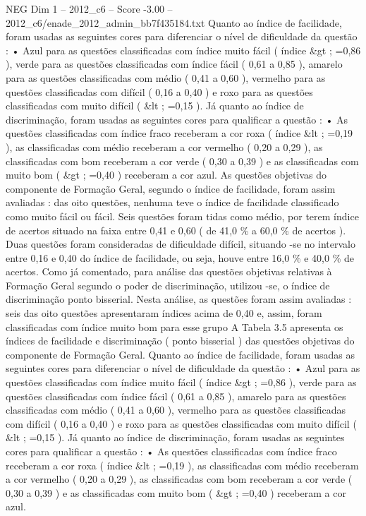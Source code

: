 \begin{textsample}{NEG Dim 1 – 2012\_c6 – Score -3.00 – 2012\_c6/enade\_2012\_admin\_bb7f435184.txt}
Quanto ao índice de facilidade, foram usadas as seguintes cores para diferenciar o nível de dificuldade da questão : • Azul para as questões classificadas com índice muito fácil ( índice \&gt ; =0,86 ), verde para as questões classificadas com índice fácil ( 0,61 a 0,85 ), amarelo para as questões classificadas com médio ( 0,41 a 0,60 ), vermelho para as questões classificadas com difícil ( 0,16 a 0,40 ) e roxo para as questões classificadas com muito difícil ( \&lt ; =0,15 ).
Já quanto ao índice de discriminação, foram usadas as seguintes cores para qualificar a questão : • As questões classificadas com índice fraco receberam a cor roxa ( índice \&lt ; =0,19 ), as classificadas com médio receberam a cor vermelho ( 0,20 a 0,29 ), as classificadas com bom receberam a cor verde ( 0,30 a 0,39 ) e as classificadas com muito bom ( \&gt ; =0,40 ) receberam a cor azul.
As questões objetivas do componente de Formação Geral, segundo o índice de facilidade, foram assim avaliadas : das oito questões, nenhuma teve o índice de facilidade classificado como muito fácil ou fácil.
Seis questões foram tidas como médio, por terem índice de acertos situado na faixa entre 0,41 e 0,60 ( de 41,0 \% a 60,0 \% de acertos ).
Duas questões foram consideradas de dificuldade difícil, situando -se no intervalo entre 0,16 e 0,40 do índice de facilidade, ou seja, houve entre 16,0 \% e 40,0 \% de acertos.
Como já comentado, para análise das questões objetivas relativas à Formação Geral segundo o poder de discriminação, utilizou -se, o índice de discriminação ponto bisserial.
Nesta análise, as questões foram assim avaliadas : seis das oito questões apresentaram índices acima de 0,40 e, assim, foram classificadas com índice muito bom para esse grupo A Tabela 3.5 apresenta os índices de facilidade e discriminação ( ponto bisserial ) das questões objetivas do componente de Formação Geral.
Quanto ao índice de facilidade, foram usadas as seguintes cores para diferenciar o nível de dificuldade da questão : • Azul para as questões classificadas com índice muito fácil ( índice \&gt ; =0,86 ), verde para as questões classificadas com índice fácil ( 0,61 a 0,85 ), amarelo para as questões classificadas com médio ( 0,41 a 0,60 ), vermelho para as questões classificadas com difícil ( 0,16 a 0,40 ) e roxo para as questões classificadas com muito difícil ( \&lt ; =0,15 ).
Já quanto ao índice de discriminação, foram usadas as seguintes cores para qualificar a questão : • As questões classificadas com índice fraco receberam a cor roxa ( índice \&lt ; =0,19 ), as classificadas com médio receberam a cor vermelho ( 0,20 a 0,29 ), as classificadas com bom receberam a cor verde ( 0,30 a 0,39 ) e as classificadas com muito bom ( \&gt ; =0,40 ) receberam a cor azul.

\end{textsample}
